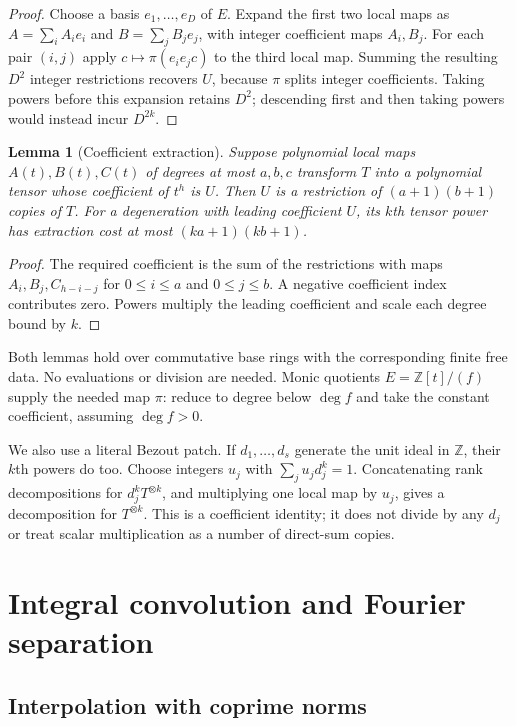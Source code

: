 \documentclass[11pt]{article}
\newtheorem{lemma}[theorem]{Lemma}
\theoremstyle{remark}
\newcommand{\Z}{\mathbb Z}
\newcommand{\tp}[1]{^{\otimes #1}}
\numberwithin{equation}{section}
\begin{document}
\begin{proof}
Choose a basis $e_1,\ldots,e_D$ of $E$. Expand the first two local
maps as $A=\sum_i A_i e_i$ and $B=\sum_j B_j e_j$, with integer
coefficient maps $A_i,B_j$. For each pair $(i,j)$ apply
$c\mapsto\pi(e_i e_jc)$ to the third local map. Summing the resulting
$D^2$ integer restrictions recovers $U$, because $\pi$ splits integer
coefficients. Taking powers before this expansion retains $D^2$;
descending first and then taking powers would instead incur $D^{2k}$.
\end{proof}

\begin{lemma}[Coefficient extraction]\label{lem:extract}
Suppose polynomial local maps $A(t),B(t),C(t)$ of degrees at most
$a,b,c$ transform $T$ into a polynomial tensor whose coefficient of
$t^h$ is $U$. Then $U$ is a restriction of $(a+1)(b+1)$ copies of $T$.
For a degeneration with leading coefficient $U$, its $k$th tensor power
has extraction cost at most $(ka+1)(kb+1)$.
\end{lemma}

\begin{proof}
The required coefficient is the sum of the restrictions with maps
$A_i,B_j,C_{h-i-j}$ for $0\leq i\leq a$ and $0\leq j\leq b$.
A negative coefficient index contributes zero. Powers multiply the
leading coefficient and scale each degree bound by $k$.
\end{proof}

Both lemmas hold over commutative base rings with the corresponding
finite free data. No evaluations or division are needed. Monic quotients
$E=\Z[t]/(f)$ supply the needed map $\pi$: reduce to degree below $\deg f$
and take the constant coefficient, assuming $\deg f>0$.

We also use a literal Bezout patch. If $d_1,\ldots,d_s$ generate the
unit ideal in $\Z$, their $k$th powers do too. Choose integers $u_j$ with
$\sum_j u_jd_j^k=1$. Concatenating rank decompositions for $d_j^kT\tp{k}$,
and multiplying one local map by $u_j$, gives a decomposition for
$T\tp{k}$. This is a coefficient identity; it does not divide by any
$d_j$ or treat scalar multiplication as a number of direct-sum copies.

\section{Integral convolution and Fourier separation}

\subsection{Interpolation with coprime norms}
\end{document}

